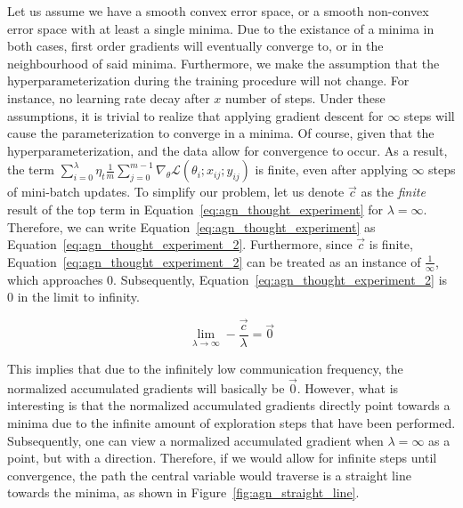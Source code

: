 Let us assume we have a smooth convex error space, or a smooth non-convex error space with at least a single minima. Due to the existance of a minima in both cases, first order gradients will eventually converge to, or in the neighbourhood of said minima. Furthermore, we  make the assumption that the hyperparameterization during the training procedure will not change. For instance, no learning rate decay after $x$ number of steps. Under these assumptions, it is trivial to realize that applying gradient descent for $\infty$ steps will cause the parameterization to converge in a minima. Of course, given that the hyperparameterization, and the data allow for convergence to occur. As a result, the term $\sum_{i = 0}^\lambda \eta_t \frac{1}{m}\sum_{j = 0}^{m - 1} \nabla_\theta \mathcal{L}(\theta_i;x_{ij};y_{ij})$ is finite, even after applying $\infty$ steps of mini-batch updates. To simplify our problem, let us denote $\vec{c}$ as the \emph{finite} result of the top term in Equation~\ref{eq:agn_thought_experiment} for $\lambda = \infty$. Therefore, we can write Equation~\ref{eq:agn_thought_experiment} as Equation~\ref{eq:agn_thought_experiment_2}. Furthermore, since $\vec{c}$ is finite, Equation~\ref{eq:agn_thought_experiment_2} can be treated as an instance of $\frac{1}{\infty}$, which approaches 0. Subsequently, Equation~\ref{eq:agn_thought_experiment_2} is 0 in the limit to infinity.

\begin{equation}
  \label{eq:agn_thought_experiment_2}
  \lim_{\lambda \to \infty} - \frac{\vec{c}}{\lambda} = \vec{0}
\end{equation}

This implies that due to the infinitely low communication frequency, the normalized accumulated gradients will basically be $\vec{0}$. However, what is interesting is that the normalized accumulated gradients directly point towards a minima due to the infinite amount of exploration steps that have been performed. Subsequently, one can view a normalized accumulated gradient when $\lambda = \infty$ as a point, but with a direction. Therefore, if we would allow for infinite steps until convergence, the path the central variable would traverse is a straight line towards the minima, as shown in Figure~\ref{fig:agn_straight_line}.

